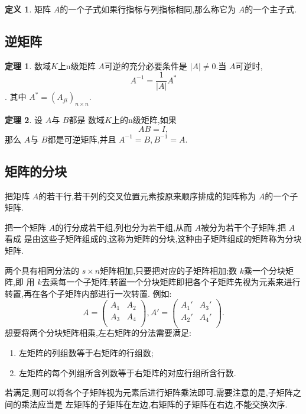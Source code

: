 \documentclass[a4paper,11pt]{article}%
\theoremstyle{remark}
\theoremstyle{definition}
\newtheorem{theorem}{定理}[section]
\theoremstyle{definition}
\newtheorem*{definition}{定义}
\theoremstyle{plain}
\newcommand*{\abs}[1]{\lvert #1 \rvert}
\begin{document}
\begin{definition}
    矩阵 $A$的一个子式如果行指标与列指标相同,那么称它为 $A$的一个主子式.
\end{definition}
\subsection{逆矩阵}
\begin{theorem}
    数域$K$上n级矩阵 $A$可逆的充分必要条件是 $\abs{A}\neq 0$.当 $A$可逆时,
    \[A^{-1}=\frac{1}{\abs{A}}A^*\].
    其中 $A^*=(A_{ji})_{n\times n}$.
\end{theorem}
\begin{theorem}
    设 $A$与 $B$都是 数域$K$上的n级矩阵,如果
    \[AB=I,\]
    那么 $A$与 $B$都是可逆矩阵,并且 $A^{-1}=B,B^{-1}=A$.
\end{theorem}
\subsection{矩阵的分块}
把矩阵 $A$的若干行,若干列的交叉位置元素按原来顺序排成的矩阵称为 $A$的一个子矩阵.

把一个矩阵 $A$的行分成若干组,列也分为若干组,从而 $A$被分为若干个子矩阵,把 $A$看成
是由这些子矩阵组成的,这称为矩阵的分块,这种由子矩阵组成的矩阵称为分块矩阵.

两个具有相同分法的 ${s\times n}$矩阵相加,只要把对应的子矩阵相加;数 $k$乘一个分块矩阵,即
用 $k$去乘每一个子矩阵;转置一个分块矩阵即把各个子矩阵先视为元素来进行转置,再在各个子矩阵内部进行一次转置.
例如:
\[A=
\begin{pmatrix}
    A_1&A_2\\
    A_3&A_4\\
\end{pmatrix}
,A'=
\begin{pmatrix}
    A_1'&A_3'\\
    A_2'&A_4'\\
\end{pmatrix}
.
\]
想要将两个分块矩阵相乘,左右矩阵的分法需要满足:
\begin{enumerate}
    \item 左矩阵的列组数等于右矩阵的行组数;
    \item 左矩阵的每个列组所含列数等于右矩阵的对应行组所含行数.
\end{enumerate}
若满足,则可以将各个子矩阵视为元素后进行矩阵乘法即可.需要注意的是,子矩阵之间的乘法应当是
左矩阵的子矩阵在左边,右矩阵的子矩阵在右边,不能交换次序.
\end{document}
